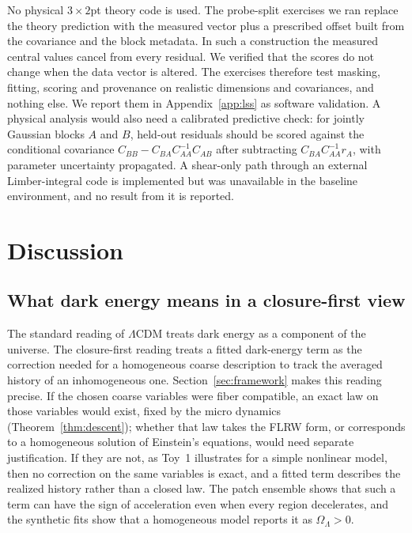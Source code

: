 \documentclass[11pt]{article}
\theoremstyle{plain}
\theoremstyle{definition}
\theoremstyle{remark}
\begin{document}
No physical $3\times2$pt theory code is used. The probe-split exercises we ran replace the theory prediction with the measured vector plus a prescribed offset built from the covariance and the block metadata. In such a construction the measured central values cancel from every residual. We verified that the scores do not change when the data vector is altered. The exercises therefore test masking, fitting, scoring and provenance on realistic dimensions and covariances, and nothing else. We report them in Appendix~\ref{app:lss} as software validation. A physical analysis would also need a calibrated predictive check: for jointly Gaussian blocks $A$ and $B$, held-out residuals should be scored against the conditional covariance $C_{BB}-C_{BA}C_{AA}^{-1}C_{AB}$ after subtracting $C_{BA}C_{AA}^{-1}r_A$, with parameter uncertainty propagated. A shear-only path through an external Limber-integral code is implemented but was unavailable in the baseline environment, and no result from it is reported.

\section{Discussion}\label{sec:discussion}

\subsection{What dark energy means in a closure-first view}\label{sec:discussion:rewrite}

The standard reading of $\Lambda$CDM treats dark energy as a component of the universe. The closure-first reading treats a fitted dark-energy term as the correction needed for a homogeneous coarse description to track the averaged history of an inhomogeneous one. Section~\ref{sec:framework} makes this reading precise. If the chosen coarse variables were fiber compatible, an exact law on those variables would exist, fixed by the micro dynamics (Theorem~\ref{thm:descent}); whether that law takes the FLRW form, or corresponds to a homogeneous solution of Einstein's equations, would need separate justification. If they are not, as Toy~1 illustrates for a simple nonlinear model, then no correction on the same variables is exact, and a fitted term describes the realized history rather than a closed law. The patch ensemble shows that such a term can have the sign of acceleration even when every region decelerates, and the synthetic fits show that a homogeneous model reports it as $\Omega_\Lambda>0$.
\end{document}

